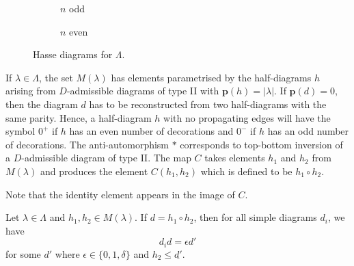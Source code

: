 \begin{figure}[!ht]
\centering
\begin{subfigure}[b]{0.48\textwidth}
\centering
{}
\caption{$n$ odd}
\end{subfigure}
\quad
\begin{subfigure}[b]{0.48\textwidth}
\caption{$n$ even}
\end{subfigure}
\caption{Hasse diagrams for $\Lambda$.}
\label{poset}
\end{figure}


If $\lambda\in\Lambda$, the set $M(\lambda)$ has elements parametrised by the half-diagrams $h$ arising from $D$-admissible diagrams of type II with $\mathbf{p}\left(h\right)=\left|\lambda\right|$. If $\mathbf{p}(d)=0$, then the diagram $d$ has to be reconstructed from two half-diagrams with the same parity. Hence, a half-diagram $h$ with no propagating edges will have the symbol $0^{+}$ if $h$ has an even number of decorations and $0^{-}$ if $h$ has an odd number of decorations.
The anti-automorphism $*$ corresponds to top-bottom inversion of a $D$-admissible diagram of type II.
The map $C$ takes elements $h_1$ and $h_2$ from $M(\lambda)$ and produces the element $C(h_1,h_2)$ which is defined to be $h_1\circ h_2.$

Note that the identity element appears in the image of $C$.

\begin{lemma}\label{axiomthree}
Let $\lambda\in\Lambda$ and $h_1,h_2\in M(\lambda)$. If $d=h_1\circ h_2$, then for all simple diagrams $d_i$, we have
\[
d_id=\epsilon d'
\]
for some $d'$ where $\epsilon\in\{0,1,\delta\}$ and $h_2\leq\underline{d'}$.
\end{lemma}


